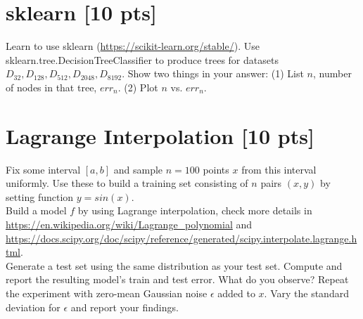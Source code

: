 \documentclass[a4paper]{article}
\theoremstyle{definition}
\begin{document}
\section{sklearn [10 pts]}
Learn to use sklearn (\url{https://scikit-learn.org/stable/}).
Use sklearn.tree.DecisionTreeClassifier to produce trees for datasets $D_{32}, D_{128}, D_{512}, D_{2048}, D_{8192}$.  Show two things in your answer: (1) List $n$, number of nodes in that tree, $err_n$. (2) Plot $n$ vs. $err_n$.

\section{Lagrange Interpolation [10 pts]}
Fix some interval $[a, b]$ and sample $n = 100$ points $x$ from this interval uniformly. Use these to build a training set consisting of $n$ pairs $(x, y)$ by setting function $y = sin(x)$. \\

Build a model $f$ by using Lagrange interpolation, check more details in \url{https://en.wikipedia.org/wiki/Lagrange_polynomial} and \url{https://docs.scipy.org/doc/scipy/reference/generated/scipy.interpolate.lagrange.html}. \\

Generate a test set using the same distribution as your test set. Compute and report the resulting model’s train and test error. What do you observe?
Repeat the experiment with zero-mean Gaussian noise $\epsilon$ added to $x$. Vary the standard deviation for $\epsilon$ and report your findings.


\end{document}
